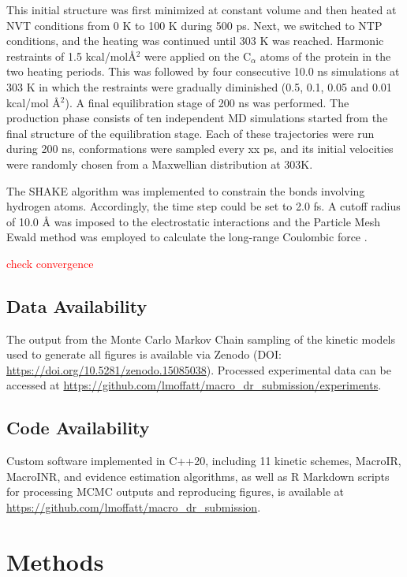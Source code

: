 \documentclass[9pt]{elife}
\begin{document}
	This initial structure was first minimized at constant volume and then heated at NVT conditions from 0 K to 100 K during 500 ps. Next, we switched to NTP conditions, and the heating was continued until 303 K was reached. Harmonic restraints of 1.5 kcal/mol{\AA}$^2$ were applied on the C$_\alpha$ atoms of the protein in the two heating periods. 
	This was followed by four consecutive 10.0 ns simulations at 303 K in which the restraints were gradually diminished (0.5, 0.1, 0.05 and 0.01 kcal/mol {\AA}$^2$). A final equilibration stage of 200 ns was performed.
	The production phase consists of ten independent MD simulations started from the final structure of the equilibration stage. Each of these trajectories were run during 200 ns, conformations were sampled every xx ps, and its initial velocities were randomly chosen from a Maxwellian distribution at 303K.
	
	The SHAKE algorithm was implemented to constrain the bonds involving hydrogen atoms. Accordingly, the time step could be set to 2.0 fs.
	A cutoff radius of 10.0 {\AA} was imposed to the electrostatic interactions and the Particle Mesh Ewald method was employed to calculate the long-range Coulombic force \cite{ewald1,ewald2}.
	
	\textcolor{red}{check convergence}
	
	
	
	
	\subsection{Data Availability}  
	The output from the Monte Carlo Markov Chain sampling of the kinetic models used to generate all figures is available via Zenodo (DOI: \url{https://doi.org/10.5281/zenodo.15085038}). Processed experimental data can be accessed at \url{https://github.com/lmoffatt/macro_dr_submission/experiments}.
	
	\subsection{Code Availability}  
	Custom software implemented in C++20, including 11 kinetic schemes, MacroIR, MacroINR, and evidence estimation algorithms, as well as R Markdown scripts for processing MCMC outputs and reproducing figures, is available at \url{https://github.com/lmoffatt/macro_dr_submission}.
	
	
	
	\section*{Methods}
	
\end{document}
